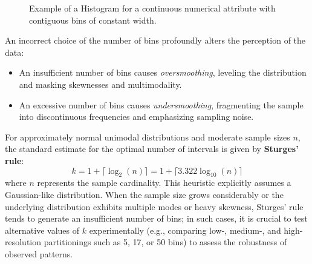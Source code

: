 \begin{figure}[H]
\centering
{}
\caption{Example of a Histogram for a continuous numerical attribute with contiguous bins of constant width.}
\label{fig:histogram-example}
\end{figure}

An incorrect choice of the number of bins profoundly alters the perception of the data:
\begin{itemize}
    \item An insufficient number of bins causes \textit{oversmoothing}, leveling the distribution and masking skewnesses and multimodality.
    \item An excessive number of bins causes \textit{undersmoothing}, fragmenting the sample into discontinuous frequencies and emphasizing sampling noise.
\end{itemize}

For approximately normal unimodal distributions and moderate sample sizes $n$, the standard estimate for the optimal number of intervals is given by \textbf{Sturges' rule}:
\begin{equation}
k = 1 + \lceil \log_2(n) \rceil = 1 + \lceil 3.322 \log_{10}(n) \rceil
\end{equation}
where $n$ represents the sample cardinality. This heuristic explicitly assumes a Gaussian-like distribution. When the sample size grows considerably or the underlying distribution exhibits multiple modes or heavy skewness, Sturges' rule tends to generate an insufficient number of bins; in such cases, it is crucial to test alternative values of $k$ experimentally (e.g., comparing low-, medium-, and high-resolution partitionings such as 5, 17, or 50 bins) to assess the robustness of observed patterns.

